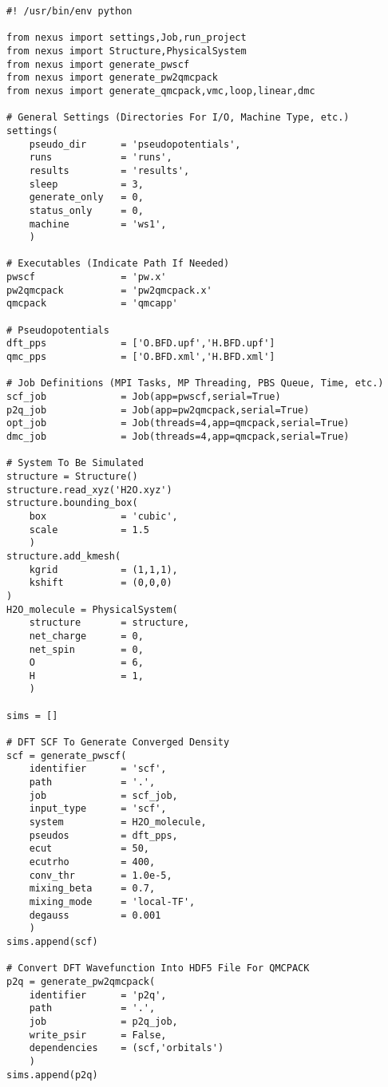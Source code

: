 \begin{lstlisting}[caption=Nexus example for H$_2$O using Quantum ESPRESSO orbitals and BFD pseudopotentials]
#! /usr/bin/env python

from nexus import settings,Job,run_project
from nexus import Structure,PhysicalSystem
from nexus import generate_pwscf
from nexus import generate_pw2qmcpack
from nexus import generate_qmcpack,vmc,loop,linear,dmc

# General Settings (Directories For I/O, Machine Type, etc.)
settings(
    pseudo_dir      = 'pseudopotentials',
    runs            = 'runs',
    results         = 'results',
    sleep           = 3,
    generate_only   = 0,
    status_only     = 0,
    machine         = 'ws1',
    )

# Executables (Indicate Path If Needed)
pwscf               = 'pw.x'
pw2qmcpack          = 'pw2qmcpack.x'
qmcpack             = 'qmcapp'

# Pseudopotentials
dft_pps             = ['O.BFD.upf','H.BFD.upf']
qmc_pps             = ['O.BFD.xml','H.BFD.xml']

# Job Definitions (MPI Tasks, MP Threading, PBS Queue, Time, etc.)
scf_job             = Job(app=pwscf,serial=True)
p2q_job             = Job(app=pw2qmcpack,serial=True)
opt_job             = Job(threads=4,app=qmcpack,serial=True)
dmc_job             = Job(threads=4,app=qmcpack,serial=True)

# System To Be Simulated
structure = Structure()
structure.read_xyz('H2O.xyz')
structure.bounding_box(
    box             = 'cubic',
    scale           = 1.5
    )
structure.add_kmesh(
    kgrid           = (1,1,1),
    kshift          = (0,0,0)
)
H2O_molecule = PhysicalSystem(
    structure       = structure,
    net_charge      = 0,
    net_spin        = 0,
    O               = 6,
    H               = 1,
    )

sims = []

# DFT SCF To Generate Converged Density
scf = generate_pwscf(
    identifier      = 'scf',
    path            = '.',
    job             = scf_job,
    input_type      = 'scf',
    system          = H2O_molecule,
    pseudos         = dft_pps,
    ecut            = 50,
    ecutrho         = 400,
    conv_thr        = 1.0e-5,
    mixing_beta     = 0.7,
    mixing_mode     = 'local-TF',
    degauss         = 0.001
    )
sims.append(scf)

# Convert DFT Wavefunction Into HDF5 File For QMCPACK
p2q = generate_pw2qmcpack(
    identifier      = 'p2q',
    path            = '.',
    job             = p2q_job,
    write_psir      = False,
    dependencies    = (scf,'orbitals')
    )
sims.append(p2q)


\end{lstlisting}
